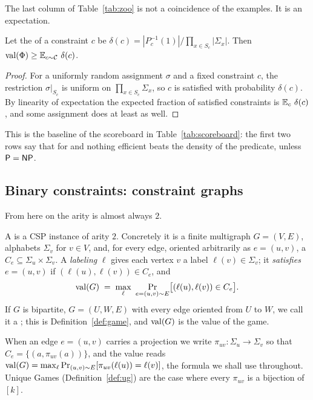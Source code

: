 The last column of Table~\ref{tab:zoo} is not a coincidence of the examples.  It is an expectation.

\begin{lemma}\label{lem:random-asg}
Let the  of a constraint $c$ be $\delta(c)=|P_c^{-1}(1)|\big/\prod_{x\in S_c}|\Sigma_x|$.  Then
$\operatorname{val}(\Phi)\ge\operatorname*{\mathbb{E}}_{c\sim\mathcal C}\,\delta(c)$.
\end{lemma}
\begin{proof}
For a uniformly random assignment $\sigma$ and a fixed constraint $c$, the restriction $\sigma|_{S_c}$ is uniform on
$\prod_{x\in S_c}\Sigma_x$, so $c$ is satisfied with probability $\delta(c)$.  By linearity of expectation
the expected fraction of satisfied constraints is $\operatorname*{\mathbb{E}}_c\,\delta(c)$, and some assignment does at least as well.
\end{proof}

\noindent
This is the baseline of the scoreboard in Table~\ref{tab:scoreboard}: the first two rows say that for
 and  nothing efficient beats the density of the predicate, unless $\mathsf{P}=\mathsf{NP}$.

\subsection{Binary constraints: constraint graphs}

From here on the arity is almost always $2$.

\begin{definition}\label{def:cg}
A  is a CSP instance of arity $2$.  Concretely it is a finite multigraph $G=(V,E)$,
alphabets $\Sigma_v$ for $v\in V$, and, for every edge, oriented arbitrarily as $e=(u,v)$, a
 $C_e\subseteq\Sigma_u\times\Sigma_v$.  A \emph{labeling} $\ell$ gives each vertex $v$ a label
$\ell(v)\in\Sigma_v$; it \emph{satisfies} $e=(u,v)$ if $(\ell(u),\ell(v))\in C_e$, and
\[
  \val(G)\;=\;\max_{\ell}\ \Pr_{e=(u,v)\sim E}\bigl[(\ell(u),\ell(v))\in C_e\bigr].
\]
If $G$ is bipartite, $G=(U,W,E)$ with every edge oriented from $U$ to $W$, we call it a ; this is
Definition~\ref{def:game}, and $\operatorname{val}(G)$ is the value of the game.
\end{definition}

\noindent
When an edge $e=(u,v)$ carries a projection we write $\pi_{uv}\colon\Sigma_u\to\Sigma_v$ so that
$C_e=\{(a,\pi_{uv}(a))\}$, and the value reads
$\operatorname{val}(G)=\max_\ell\Pr_{(u,v)\sim E}[\pi_{uv}(\ell(u))=\ell(v)]$, the formula we shall use throughout.
Unique Games (Definition~\ref{def:ug}) are the case where every $\pi_{uv}$ is a bijection of $[k]$.

